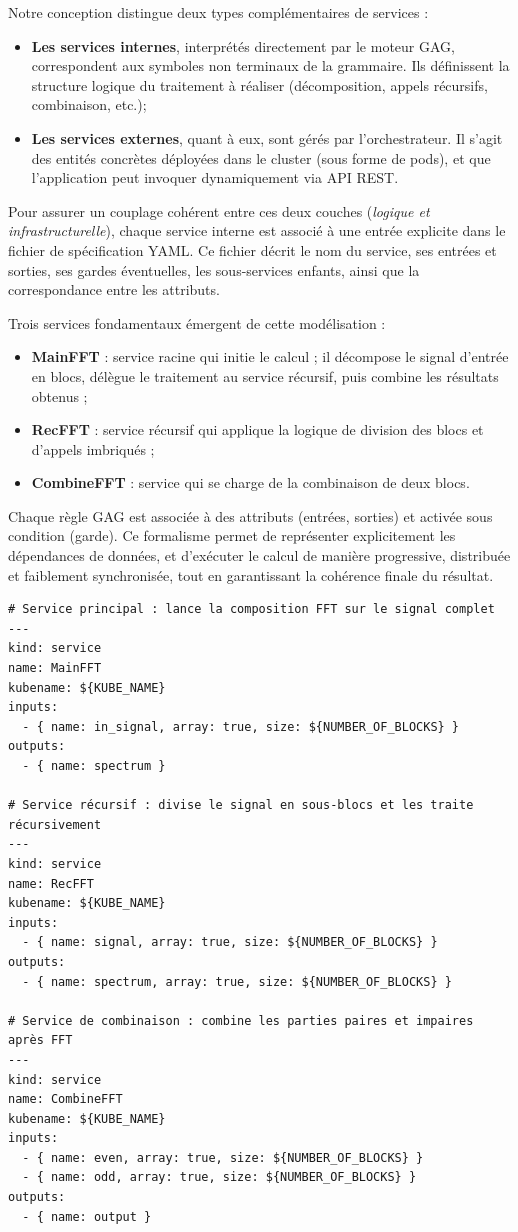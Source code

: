 Notre conception distingue deux types complémentaires de services :
\begin{itemize}
    \item \textbf{Les services internes}, interprétés directement par le moteur GAG, correspondent aux symboles non terminaux de la grammaire. Ils définissent la structure logique du traitement à réaliser (décomposition, appels récursifs, combinaison, etc.);
    \item \textbf{Les services externes}, quant à eux, sont gérés par l’orchestrateur. Il s’agit des entités concrètes déployées dans le cluster (sous forme de pods), et que l’application peut invoquer dynamiquement via API REST.
\end{itemize}

Pour assurer un couplage cohérent entre ces deux couches (\textit{logique et infrastructurelle}), chaque service interne est associé à une entrée explicite dans le fichier de spécification YAML. Ce fichier décrit le nom du service, ses entrées et sorties, ses gardes éventuelles, les sous-services enfants, ainsi que la correspondance entre les attributs.

Trois services fondamentaux émergent de cette modélisation :
\begin{itemize}
  \item \textbf{MainFFT} : service racine qui initie le calcul ; il décompose le signal d’entrée en blocs, délègue le traitement au service récursif, puis combine les résultats obtenus ;
  \item \textbf{RecFFT} : service récursif qui applique la logique de division des blocs et d’appels imbriqués ;
  \item \textbf{CombineFFT} : service qui se charge de la combinaison de deux blocs.
\end{itemize}

Chaque règle GAG est associée à des attributs (entrées, sorties) et activée sous condition (garde). Ce formalisme permet de représenter explicitement les dépendances de données, et d’exécuter le calcul de manière progressive, distribuée et faiblement synchronisée, tout en garantissant la cohérence finale du résultat.
\vspace{0.5cm}
\begin{lstlisting}[caption={Declaration des Services}, label={lst:services}]
# Service principal : lance la composition FFT sur le signal complet
---
kind: service
name: MainFFT
kubename: ${KUBE_NAME}
inputs:
  - { name: in_signal, array: true, size: ${NUMBER_OF_BLOCKS} }
outputs:
  - { name: spectrum }
  
# Service récursif : divise le signal en sous-blocs et les traite récursivement
---
kind: service
name: RecFFT
kubename: ${KUBE_NAME}
inputs:
  - { name: signal, array: true, size: ${NUMBER_OF_BLOCKS} }
outputs:
  - { name: spectrum, array: true, size: ${NUMBER_OF_BLOCKS} }
  
# Service de combinaison : combine les parties paires et impaires après FFT
---
kind: service
name: CombineFFT
kubename: ${KUBE_NAME}
inputs:
  - { name: even, array: true, size: ${NUMBER_OF_BLOCKS} }
  - { name: odd, array: true, size: ${NUMBER_OF_BLOCKS} }
outputs:
  - { name: output }
\end{lstlisting}

